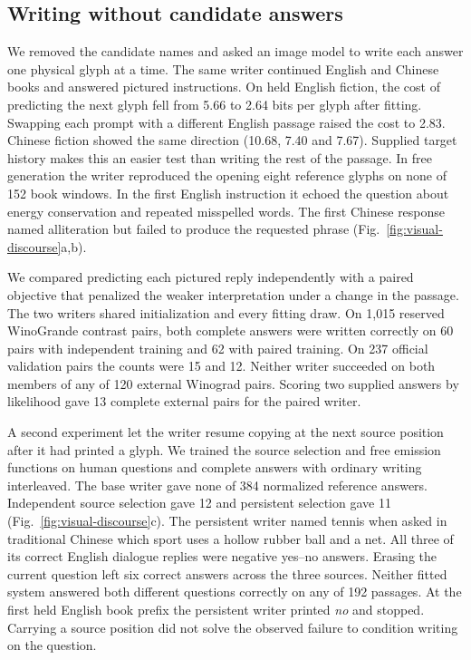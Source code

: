 \subsection*{Writing without candidate answers}
We removed the candidate names and asked an image model to write each answer one physical glyph at a time. The same writer continued English and Chinese books and answered pictured instructions. On held English fiction, the cost of predicting the next glyph fell from 5.66 to 2.64 bits per glyph after fitting. Swapping each prompt with a different English passage raised the cost to 2.83. Chinese fiction showed the same direction (10.68, 7.40 and 7.67). Supplied target history makes this an easier test than writing the rest of the passage. In free generation the writer reproduced the opening eight reference glyphs on none of 152 book windows. In the first English instruction it echoed the question about energy conservation and repeated misspelled words. The first Chinese response named alliteration but failed to produce the requested phrase (Fig.~\ref{fig:visual-discourse}a,b).

We compared predicting each pictured reply independently with a paired objective that penalized the weaker interpretation under a change in the passage. The two writers shared initialization and every fitting draw. On 1,015 reserved WinoGrande contrast pairs, both complete answers were written correctly on 60 pairs with independent training and 62 with paired training. On 237 official validation pairs the counts were 15 and 12. Neither writer succeeded on both members of any of 120 external Winograd pairs. Scoring two supplied answers by likelihood gave 13 complete external pairs for the paired writer.

A second experiment let the writer resume copying at the next source position after it had printed a glyph. We trained the source selection and free emission functions on human questions and complete answers with ordinary writing interleaved. The base writer gave none of 384 normalized reference answers. Independent source selection gave 12 and persistent selection gave 11 (Fig.~\ref{fig:visual-discourse}c). The persistent writer named tennis when asked in traditional Chinese which sport uses a hollow rubber ball and a net. All three of its correct English dialogue replies were negative yes--no answers. Erasing the current question left six correct answers across the three sources. Neither fitted system answered both different questions correctly on any of 192 passages. At the first held English book prefix the persistent writer printed \emph{no} and stopped. Carrying a source position did not solve the observed failure to condition writing on the question.
